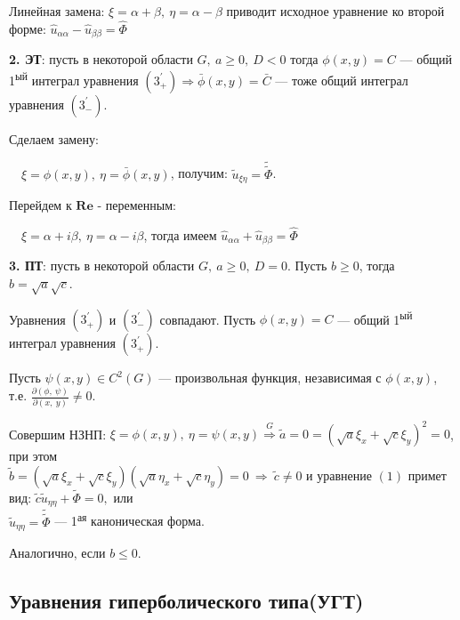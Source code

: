 Линейная замена: $\xi = \alpha + \beta,\ \eta = \alpha - \beta$ приводит исходное уравнение ко второй форме: $\hat{u}_{\alpha\alpha} - \hat{u}_{\beta\beta} = \hat{\Phi}$

\textbf{2. ЭТ}: пусть в некоторой области $G,\ a \ge 0,\ D < 0$ тогда $\phi(x, y)=C$ --- общий 1\textsuperscript{ый} интеграл  уравнения $(3_+^\prime) \Rightarrow \bar{\phi}(x, y) = \bar C$ --- тоже общий интеграл уравнения $(3_-^\prime)$.

Сделаем замену:

$\quad \xi=\phi(x, y),\ \eta = \bar\phi(x, y)$, получим: $\tilde u_{\xi \eta} = \tilde{\tilde{\Phi}}$.

Перейдем к $\mathbf{Re}$ - переменным:

$\quad \xi = \alpha + i\beta,\ \eta = \alpha - i\beta$, тогда имеем $\hat{u}_{\alpha\alpha} + \hat{u}_{\beta\beta} = \hat{\Phi}$

\textbf{3. ПТ}: пусть в некоторой области $G,\ a \ge 0,\ D = 0$. Пусть $b \ge 0$, тогда $b=\sqrt{a}\sqrt{c}$.

Уравнения $(3_+^\prime)$ и $(3_-^\prime)$ совпадают. Пусть $\phi(x, y)=C$ --- общий 1\textsuperscript{ый} интеграл уравнения $(3_+^\prime)$.

Пусть $\psi(x, y) \in C^2(G)$ --- произвольная функция, независимая с $\phi(x, y)$, т.е. $\frac{\partial(\phi,\ \psi)}{\partial(x,\ y)} \neq 0$.

Совершим НЗНП: $\xi = \phi(x, y),\ \eta=\psi(x, y) \overset{G}{\Rightarrow} \tilde a = 0 = (\sqrt{a}\xi_x+\sqrt{c}\xi_y)^2=0$, при этом \\ $\tilde b=(\sqrt{a}\xi_x + \sqrt{c}\xi_y)(\sqrt{a}\eta_x + \sqrt{c}\eta_y)=0\ \Rightarrow\ \tilde c \neq 0$ и уравнение $(1)$ примет вид: $\tilde c \tilde u_{\eta\eta} + \tilde \Phi = 0,$ или\\ $\tilde u_{\eta\eta} = \tilde{\tilde{\Phi}}$ --- 1\textsuperscript{ая} каноническая форма.

Аналогично, если $b \le 0$.

\subsection{Уравнения гиперболического типа(УГТ)}

